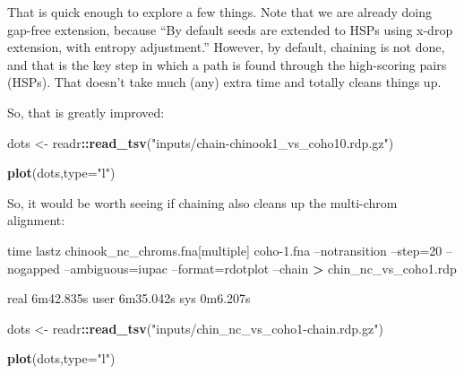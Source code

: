 \documentclass[]{krantz}
\makeatletter
\newenvironment{Shaded}{\begin{snugshade}}{\end{snugshade}}
\newcommand{\BuiltInTok}[1]{#1}
\newcommand{\DataTypeTok}[1]{\textcolor[rgb]{0.27,0.27,0.27}{#1}}
\newcommand{\ExtensionTok}[1]{#1}
\newcommand{\KeywordTok}[1]{\textcolor[rgb]{0.27,0.27,0.27}{\textbf{#1}}}
\newcommand{\NormalTok}[1]{#1}
\newcommand{\OperatorTok}[1]{\textcolor[rgb]{0.43,0.43,0.43}{\textbf{#1}}}
\newcommand{\StringTok}[1]{\textcolor[rgb]{0.5,0.5,0.5}{#1}}
\newcommand{\VariableTok}[1]{\textcolor[rgb]{0,0,0}{#1}}
\newenvironment{kframe}{%
\medskip{}
\setlength{\fboxsep}{.8em}
 \def\at@end@of@kframe{}%
 \ifinner\ifhmode%
  \def\at@end@of@kframe{\end{minipage}}%
  \begin{minipage}{\columnwidth}%
 \fi\fi%
 \def\FrameCommand##1{\hskip\@totalleftmargin \hskip-\fboxsep
 \colorbox{shadecolor}{##1}\hskip-\fboxsep
     \hskip-\linewidth \hskip-\@totalleftmargin \hskip\columnwidth}%
 \MakeFramed {\advance\hsize-\width
   \@totalleftmargin\z@ \linewidth\hsize
   \@setminipage}}%
 {\par\unskip\endMakeFramed%
 \at@end@of@kframe}
\renewenvironment{Shaded}{\begin{kframe}}{\end{kframe}}
\makeatother
\begin{document}
That is quick enough to explore a few things. Note that we are already doing gap-free extension, because
``By default seeds are extended to HSPs using x-drop extension, with entropy adjustment.'' However, by
default, chaining is not done, and that is the key step in which a path is found through the
high-scoring pairs (HSPs). That doesn't take much (any) extra time and totally cleans things up.

\begin{Shaded}
\end{Shaded}

So, that is greatly improved:

\begin{Shaded}
\begin{Highlighting}[]
\NormalTok{dots <-}\StringTok{ }\NormalTok{readr}\OperatorTok{::}\KeywordTok{read_tsv}\NormalTok{(}\StringTok{"inputs/chain-chinook1_vs_coho10.rdp.gz"}\NormalTok{)}

\KeywordTok{plot}\NormalTok{(dots,}\DataTypeTok{type=}\StringTok{"l"}\NormalTok{)}
\end{Highlighting}
\end{Shaded}

So, it would be worth seeing if chaining also cleans up the multi-chrom alignment:

\begin{Shaded}
\begin{Highlighting}[]
\BuiltInTok{time}\NormalTok{ lastz chinook_nc_chroms.fna[multiple]  coho-1.fna --notransition --step=20 --nogapped --ambiguous=iupac --format=rdotplot --chain }\OperatorTok{>}\NormalTok{ chin_nc_vs_coho1.rdp}

\ExtensionTok{real}\NormalTok{    6m42.835s}
\ExtensionTok{user}\NormalTok{    6m35.042s}
\ExtensionTok{sys}\NormalTok{ 0m6.207s}
\end{Highlighting}
\end{Shaded}

\begin{Shaded}
\begin{Highlighting}[]
\NormalTok{dots <-}\StringTok{ }\NormalTok{readr}\OperatorTok{::}\KeywordTok{read_tsv}\NormalTok{(}\StringTok{"inputs/chin_nc_vs_coho1-chain.rdp.gz"}\NormalTok{)}

\KeywordTok{plot}\NormalTok{(dots,}\DataTypeTok{type=}\StringTok{"l"}\NormalTok{)}
\end{Highlighting}
\end{Shaded}
\end{document}

